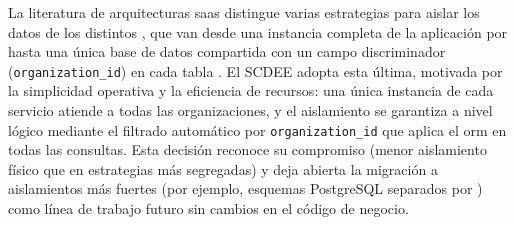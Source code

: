 La literatura de arquitecturas \acs{saas} distingue varias estrategias para
aislar los datos de los distintos , que van desde una
instancia completa de la aplicación por  hasta una única base
de datos compartida con un campo discriminador
(\texttt{organization\_id}) en cada tabla \cite{golding2024multitenant}.
El SCDEE adopta esta última, motivada por la simplicidad operativa y la
eficiencia de recursos: una única instancia de cada servicio atiende a
todas las organizaciones, y el aislamiento se garantiza a nivel lógico
mediante el filtrado automático por \texttt{organization\_id} que aplica
el \acs{orm} en todas las consultas. Esta decisión reconoce su compromiso
(menor aislamiento físico que en estrategias más segregadas) y deja
abierta la migración a aislamientos más fuertes (por ejemplo, esquemas
PostgreSQL separados por ) como línea de trabajo futuro sin
cambios en el código de negocio.
